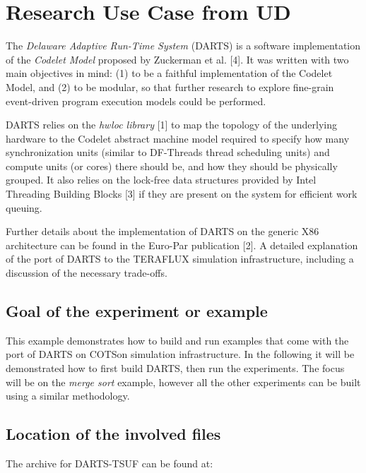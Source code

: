 \documentclass[a4paper]{article}
\begin{document}
\section[Research Use Case from UD]{Research Use Case from UD}
{
{The
}\textit{{Delaware
Adaptive Run-Time
System}}{ (DARTS)
is a software implementation of the
}\textit{{Codelet
Model}}{ proposed
by Zuckerman et al. [4]. It was written with two main objectives in
mind: (1) to be a faithful implementation of the Codelet Model, and (2)
to be modular, so that further research to explore fine-grain
event-driven program execution models could be performed.}}

{
{DARTS relies on the
}\textit{{hwloc
library}}{ [1] to
map the topology of the underlying hardware to the Codelet abstract
machine model required to specify how many synchronization units
(similar to DF-Threads{\textquotesingle} thread scheduling units) and
compute units (or cores) there should be, and how they should be
physically grouped. It also relies on the lock-free data structures
provided by Intel Threading Building Blocks [3] if they are present on
the system for efficient work queuing.}}

{
{Further details
about the implementation of DARTS on the generic X86 architecture can
be found in the Euro-Par publication [2]. A detailed explanation of the
port of DARTS to the TERAFLUX simulation infrastructure, including a
discussion of the necessary trade-offs.}}

\subsection[Goal of the experiment or example]{Goal of the experiment or
example}
{
This example demonstrates how to build and run examples that come with
the port of DARTS on COTSon simulation infrastructure. In the following
it will be demonstrated how to first build DARTS, then run the
experiments. The focus will be on the \textit{merge sort} example,
however all the other experiments can be built using a similar
methodology.}

\subsection[Location of the involved files]{Location of the involved
files}
{
The archive for DARTS-TSUF can be found at: \ }
\end{document}
